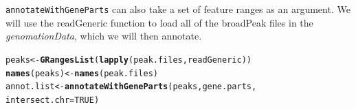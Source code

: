 \documentclass{article}\usepackage[]{graphicx}\usepackage[]{color}
\makeatletter
\newcommand{\hlnum}[1]{\textcolor[rgb]{0.686,0.059,0.569}{#1}}%
\newcommand{\hlstd}[1]{\textcolor[rgb]{0.345,0.345,0.345}{#1}}%
\newcommand{\hlkwb}[1]{\textcolor[rgb]{0.69,0.353,0.396}{#1}}%
\newcommand{\hlkwc}[1]{\textcolor[rgb]{0.333,0.667,0.333}{#1}}%
\newcommand{\hlkwd}[1]{\textcolor[rgb]{0.737,0.353,0.396}{\textbf{#1}}}%
\newenvironment{kframe}{%
 \def\at@end@of@kframe{}%
 \ifinner\ifhmode%
  \def\at@end@of@kframe{\end{minipage}}%
  \begin{minipage}{\columnwidth}%
 \fi\fi%
 \def\FrameCommand##1{\hskip\@totalleftmargin \hskip-\fboxsep
 \colorbox{shadecolor}{##1}\hskip-\fboxsep
     \hskip-\linewidth \hskip-\@totalleftmargin \hskip\columnwidth}%
 \MakeFramed {\advance\hsize-\width
   \@totalleftmargin\z@ \linewidth\hsize
   \@setminipage}}%
 {\par\unskip\endMakeFramed%
 \at@end@of@kframe}
\newenvironment{knitrout}{}{} %
\newcommand{\Rpackage}[1]{{\textit{#1}}}
\newcommand{\Rcode}[1]{{\texttt{#1}}}
\makeatother
\begin{document}
\Rcode{annotateWithGeneParts} can also take a set of feature ranges as an argument.
We will use the readGeneric function to load all of the broadPeak files in the
\Rpackage{genomationData}, which we will then annotate.
\begin{knitrout}
\color{fgcolor}\begin{kframe}
\begin{alltt}
\hlstd{peaks} \hlkwb{<-} \hlkwd{GRangesList}\hlstd{(}\hlkwd{lapply}\hlstd{(peak.files, readGeneric))}
\hlkwd{names}\hlstd{(peaks)} \hlkwb{<-} \hlkwd{names}\hlstd{(peak.files)}
\hlstd{annot.list} \hlkwb{<-} \hlkwd{annotateWithGeneParts}\hlstd{(peaks, gene.parts,}
    \hlkwc{intersect.chr} \hlstd{=} \hlnum{TRUE}\hlstd{)}
\end{alltt}


{\ttfamily\noindent\itshape\color{messagecolor}{\#\# Working on: Ctcf\\\#\# intersecting chromosomes...\\\#\# Working on: P300\\\#\# intersecting chromosomes...\\\#\# Working on: Suz12\\\#\# intersecting chromosomes...\\\#\# Working on: Rad21\\\#\# intersecting chromosomes...}}\end{kframe}
\end{knitrout}
\end{document}
